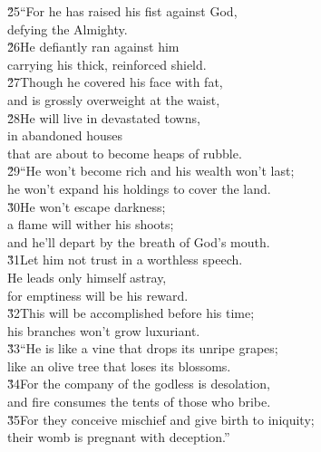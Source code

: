 \begin{poetry}
\poeml \v{25}``For he has raised his fist against God, \\
\poemll    defying the Almighty. \\
\poeml \v{26}He defiantly ran against him \\
\poemll    carrying his thick, reinforced shield. \\
\poeml \v{27}Though he covered his face with fat, \\
\poemll    and is grossly overweight at the waist, \\
\poeml \v{28}He will live in devastated towns, \\
\poemll    in abandoned houses \\
\poemlll       that are about to become heaps of rubble. \\
\poeml \v{29}``He won't become rich and his wealth won't last; \\
\poemll    he won't expand his holdings to cover the land. \\
\poeml \v{30}He won't escape darkness; \\
\poemll    a flame will wither his shoots; \\
\poemlll       and he'll depart by the breath of God's mouth. \\
\poeml \v{31}Let him not trust in a worthless speech. \\
\poemll    He leads only himself astray, \\
\poemlll       for emptiness will be his reward. \\
\poeml \v{32}This will be accomplished before his time; \\
\poemll    his branches won't grow luxuriant. \\
\poeml \v{33}``He is like a vine that drops its unripe grapes; \\
\poemll    like an olive tree that loses its blossoms. \\
\poeml \v{34}For the company of the godless is desolation, \\
\poemll    and fire consumes the tents of those who bribe. \\
\poeml \v{35}For they conceive mischief and give birth to iniquity; \\
\poemll    their womb is pregnant with deception.''
\end{poetry}

